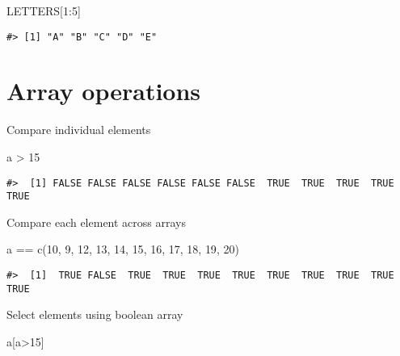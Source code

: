 \documentclass[
]{book}
\newenvironment{Shaded}{\begin{snugshade}}{\end{snugshade}}
\newcommand{\DecValTok}[1]{\textcolor[rgb]{0.00,0.00,0.81}{#1}}
\newcommand{\FunctionTok}[1]{\textcolor[rgb]{0.00,0.00,0.00}{#1}}
\newcommand{\NormalTok}[1]{#1}
\newcommand{\SpecialCharTok}[1]{\textcolor[rgb]{0.00,0.00,0.00}{#1}}
\begin{document}
\begin{Shaded}
\begin{Highlighting}[]
\NormalTok{LETTERS[}\DecValTok{1}\SpecialCharTok{:}\DecValTok{5}\NormalTok{]}
\end{Highlighting}
\end{Shaded}

\begin{verbatim}
#> [1] "A" "B" "C" "D" "E"
\end{verbatim}

\hypertarget{array-operations}{%
\section{Array operations}\label{array-operations}}

Compare individual elements

\begin{Shaded}
\begin{Highlighting}[]
\NormalTok{a }\SpecialCharTok{\textgreater{}} \DecValTok{15}
\end{Highlighting}
\end{Shaded}

\begin{verbatim}
#>  [1] FALSE FALSE FALSE FALSE FALSE FALSE  TRUE  TRUE  TRUE  TRUE  TRUE
\end{verbatim}

Compare each element across arrays

\begin{Shaded}
\begin{Highlighting}[]
\NormalTok{a }\SpecialCharTok{==} \FunctionTok{c}\NormalTok{(}\DecValTok{10}\NormalTok{, }\DecValTok{9}\NormalTok{, }\DecValTok{12}\NormalTok{, }\DecValTok{13}\NormalTok{, }\DecValTok{14}\NormalTok{, }\DecValTok{15}\NormalTok{, }\DecValTok{16}\NormalTok{, }\DecValTok{17}\NormalTok{, }\DecValTok{18}\NormalTok{, }\DecValTok{19}\NormalTok{, }\DecValTok{20}\NormalTok{)}
\end{Highlighting}
\end{Shaded}

\begin{verbatim}
#>  [1]  TRUE FALSE  TRUE  TRUE  TRUE  TRUE  TRUE  TRUE  TRUE  TRUE  TRUE
\end{verbatim}

Select elements using boolean array

\begin{Shaded}
\begin{Highlighting}[]
\NormalTok{a[a}\SpecialCharTok{\textgreater{}}\DecValTok{15}\NormalTok{]}
\end{Highlighting}
\end{Shaded}
\end{document}
